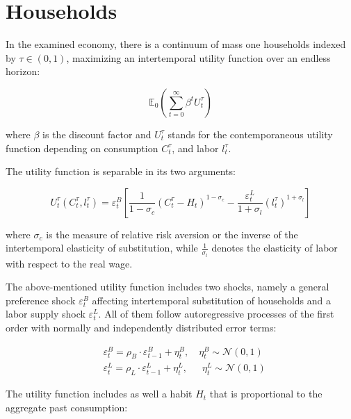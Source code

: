 \documentclass{pracamgr}
\numberwithin{equation}{section}
\begin{document}
\section{Households} \label{DSGE - Households}

In the examined economy, there is a continuum of mass one households indexed by $\tau \in (0,1)$, maximizing an intertemporal utility function over an endless horizon:

\begin{equation}
 \mathbb{E}_{0} \left(\sum\limits_{t=0}^{\infty} \beta^{t} U_{t}^{\tau} \right) 
\end{equation}

where $\beta$ is the discount factor and $U_{t}^{\tau}$ stands for the contemporaneous utility
function depending on consumption $C_{t}^{\tau}$, and labor $l_{t}^{\tau}$.

The utility function is separable in its two arguments:

\begin{equation}
U_{t}^{\tau} \left( C_{t}^{\tau}, l_{t}^{\tau} \right) = \varepsilon^{B}_{t} \left[ \frac{1}{1-\sigma_{c}} \left( C_{t}^{\tau} - H_{t} \right)^{1-\sigma_{c}} - \frac{\varepsilon_{t}^{L}}{1+\sigma_{l}} \left( l_{t}^{\tau} \right)^{1+\sigma_{l}} \right]
\end{equation}

where $\sigma_{c}$ is the measure of relative risk aversion or the inverse of the intertemporal elasticity of substitution, while $\frac{1}{\sigma_{l}}$ denotes the elasticity of labor with respect to the real wage.

The above-mentioned utility function includes two shocks, namely a general preference shock $\varepsilon^{B}_{t}$ affecting intertemporal substitution of households and a labor supply shock $\varepsilon^{L}_{t}$. All of them follow autoregressive processes of the first order with normally and independently distributed error terms:

\begin{align}
& \varepsilon^{B}_{t} = \rho_{B} \cdot \varepsilon^{B}_{t-1}+ \eta_{t}^{B}, \enspace \enspace \eta_{t}^{B} \sim \mathcal{N}(0,1) \\
& \varepsilon^{L}_{t} = \rho_{L} \cdot \varepsilon^{L}_{t-1}+ \eta_{t}^{L}, \enspace \enspace\enspace \eta_{t}^{L} \sim \mathcal{N}(0,1) 
\end{align}

The utility function includes as well a habit $H_{t}$ that is proportional to the aggregate past consumption:
\end{document}
